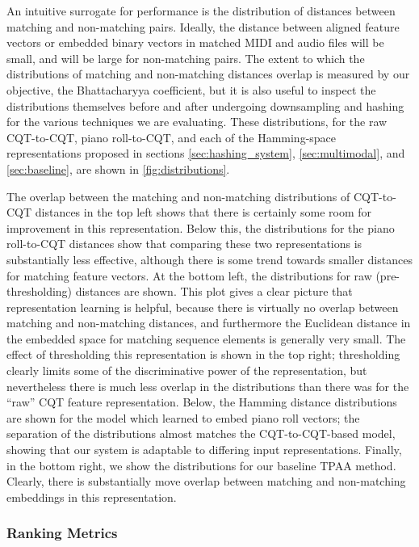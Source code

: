An intuitive surrogate for performance is the distribution of distances between matching and non-matching pairs.
Ideally, the distance between aligned feature vectors or embedded binary vectors in matched MIDI and audio files will be small, and will be large for non-matching pairs.
The extent to which the distributions of matching and non-matching distances overlap is measured by our objective, the Bhattacharyya coefficient, but it is also useful to inspect the distributions themselves before and after undergoing downsampling and hashing for the various techniques we are evaluating.
These distributions, for the raw CQT-to-CQT, piano roll-to-CQT, and each of the Hamming-space representations proposed in sections \ref{sec:hashing_system}, \ref{sec:multimodal}, and \ref{sec:baseline}, are shown in \cref{fig:distributions}.

The overlap between the matching and non-matching distributions of CQT-to-CQT distances in the top left shows that there is certainly some room for improvement in this representation.
Below this, the distributions for the piano roll-to-CQT distances show that comparing these two representations is substantially less effective, although there is some trend towards smaller distances for matching feature vectors.
At the bottom left, the distributions for raw (pre-thresholding) distances are shown.
This plot gives a clear picture that representation learning is helpful, because there is virtually no overlap between matching and non-matching distances, and furthermore the Euclidean distance in the embedded space for matching sequence elements is generally very small.
The effect of thresholding this representation is shown in the top right; thresholding clearly limits some of the discriminative power of the representation, but nevertheless there is much less overlap in the distributions than there was for the ``raw'' CQT feature representation.
Below, the Hamming distance distributions are shown for the model which learned to embed piano roll vectors; the separation of the distributions almost matches the CQT-to-CQT-based model, showing that our system is adaptable to differing input representations.
Finally, in the bottom right, we show the distributions for our baseline TPAA method.
Clearly, there is substantially move overlap between matching and non-matching embeddings in this representation.

\subsubsection{Ranking Metrics}

